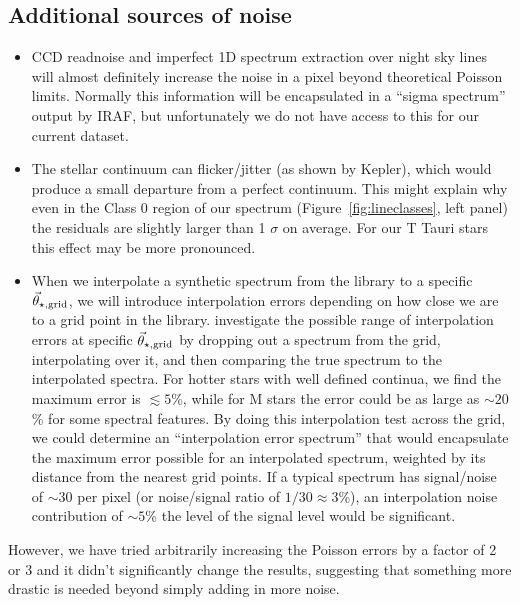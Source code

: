 \documentclass[preprint]{aastex} %
\newcommand{\vt}{\vec{\theta}}
\newcommand{\vg}{\vt_{\star, {\rm grid}}}
\begin{document}
\subsection{Additional sources of noise}
\begin{itemize}
  \item CCD readnoise and imperfect 1D spectrum extraction over night sky lines will almost definitely increase the noise in a pixel beyond theoretical Poisson limits. Normally this information will be encapsulated in a ``sigma spectrum'' output by IRAF, but unfortunately we do not have access to this for our current dataset.
  \item The stellar continuum can flicker/jitter (as shown by Kepler), which would produce a small departure from a perfect continuum. This might explain why even in the Class 0 region of our spectrum (Figure~\ref{fig:lineclasses}, left panel) the residuals are slightly larger than 1 $\sigma$ on average. For our T Tauri stars this effect may be more pronounced.
  \item When we interpolate a synthetic spectrum from the library to a specific $\vg$, we will introduce interpolation errors depending on how close we are to a grid point in the library. \citet{hus12} investigate the possible range of interpolation errors at specific $\vg$ by dropping out a spectrum from the grid, interpolating over it, and then comparing the true spectrum to the interpolated spectra. For hotter stars with well defined continua, we find the maximum error is $\lesssim 5$\%, while for M stars the error could be as large as $\sim 20$\% for some spectral features. By doing this interpolation test across the grid, we could determine an ``interpolation error spectrum'' that would encapsulate the maximum error possible for an interpolated spectrum, weighted by its distance from the nearest grid points. If a typical spectrum has signal/noise of $\sim 30$ per pixel (or noise/signal ratio of $1/30 \approx 3$\%), an interpolation noise contribution of $\sim 5$\% the level of the signal level would be significant. 
\end{itemize}
However, we have tried arbitrarily increasing the Poisson errors by a factor of 2 or 3 and it didn't significantly change the results, suggesting that something more drastic is needed beyond simply adding in more noise.
\end{document}
